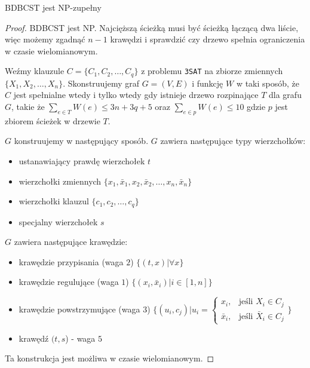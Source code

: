 \begin{theorem}
    BDBCST jest NP-zupełny

    \begin{proof}
        BDBCST jest NP. Najcięższą ścieżką musi być ścieżką łączącą dwa liście, więc możemy zgadnąć $n-1$ krawędzi i sprawdzić czy drzewo spełnia ograniczenia w czasie wielomianowym.
        
        Weźmy klauzule $C = \{C_1, C_2, \ldots, C_q\}$ z problemu \texttt{3SAT} na zbiorze zmiennych $\{X_1, X_2, \ldots, X_n\}$. Skonstruujemy graf $G = (V, E)$ i funkcję $W$ w taki sposób, że $C$ jest spełnialne wtedy i tylko wtedy gdy istnieje drzewo rozpinające $T$ dla grafu $G$, takie że $\sum_{e\in T} W(e) \leq 3n + 3q + 5$ oraz $\sum_{e\in p} W(e) \leq 10$ gdzie $p$ jest zbiorem ścieżek w drzewie $T$.

        $G$ konstruujemy w następujący sposób. $G$ zawiera następujące typy wierzchołków:
        \begin{itemize}
            \item ustanawiający prawdę wierzchołek $t$
            \item wierzchołki zmiennych $\{x_1, \bar{x}_1, x_2, \bar{x}_2, \ldots, x_n, \bar{x}_n\}$
            \item wierzchołki klauzul $\{c_1, c_2, \ldots, c_q\}$
            \item specjalny wierzchołek $s$
        \end{itemize}
        $G$ zawiera następujące krawędzie:
        \begin{itemize}
            \item krawędzie przypisania (waga $2$) $\{(t, x) | \forall x\}$
            \item krawędzie regulujące (waga $1$) $\{(x_i, \bar{x}_i) | i \in [1,n]\}$
            \item krawędzie powstrzymujące (waga $3$) $\{(u_i, c_j) | u_i = \begin{cases}
                x_i,        & \text{jeśli } X_i \in C_j\\
                \bar{x}_i,  & \text{jeśli }  \bar{X}_i \in C_j
            \end{cases}\}$
            \item krawędź $(t, s$) - waga $5$
        \end{itemize}
        Ta konstrukcja jest możliwa w czasie wielomianowym.


\end{proof}
\end{theorem}
